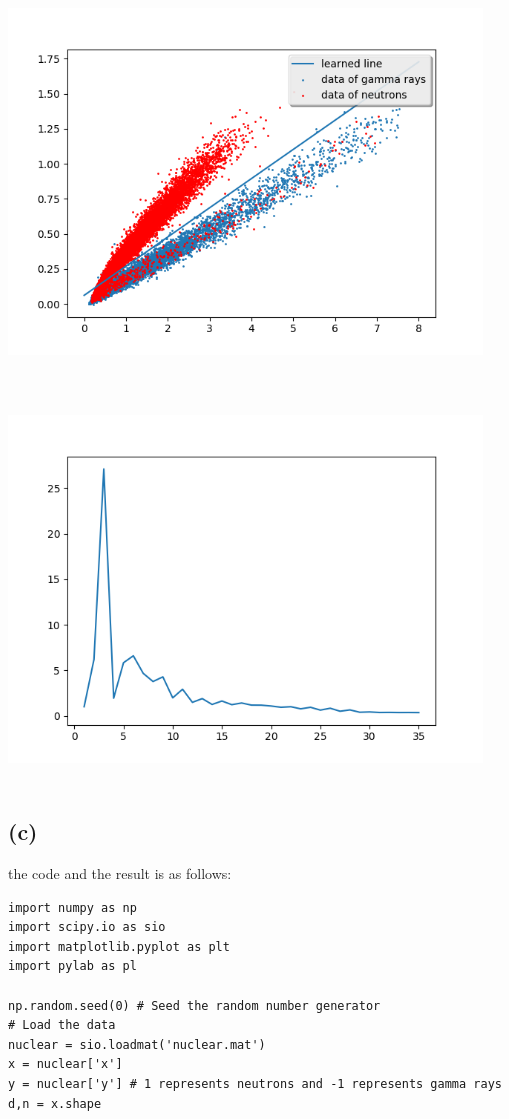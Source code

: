 \documentclass[letterpaper,11pt]{article}
\begin{document}
\begin{spacing}{1.2}
\includegraphics[width=4.95in,height=4.05in]{sg_opt_smh.png}

\includegraphics[width=4.95in,height=4.05in]{sg_opt_smh_J.png}

\subsection*{(c)}
the code and the result is as follows:
\begin{lstlisting}
import numpy as np
import scipy.io as sio
import matplotlib.pyplot as plt
import pylab as pl

np.random.seed(0) # Seed the random number generator
# Load the data
nuclear = sio.loadmat('nuclear.mat')
x = nuclear['x']
y = nuclear['y'] # 1 represents neutrons and -1 represents gamma rays
d,n = x.shape


\end{lstlisting}
\end{spacing}
\end{document}
